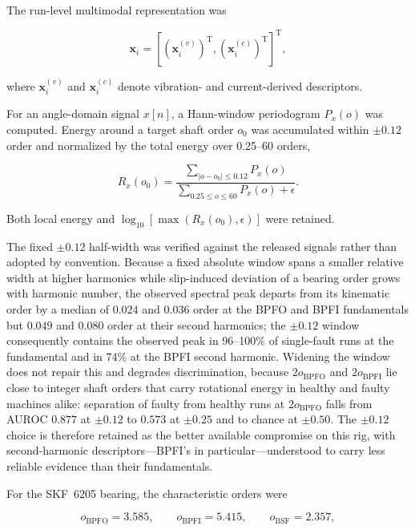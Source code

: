 \documentclass{ieeeaccess}
\begin{document}
The run-level multimodal representation was

\begin{equation}
\mathbf{x}_i =
\left[
\left(\mathbf{x}^{(v)}_i\right)^{\mathrm{T}},
\left(\mathbf{x}^{(c)}_i\right)^{\mathrm{T}}
\right]^{\mathrm{T}},
\label{eq:multimodal_feature}
\end{equation}

where $\mathbf{x}^{(v)}_i$ and $\mathbf{x}^{(c)}_i$ denote vibration- and
current-derived descriptors.

For an angle-domain signal $x[n]$, a Hann-window periodogram $P_x(o)$ was
computed. Energy around a target shaft order $o_0$ was accumulated within
$\pm0.12$ order and normalized by the total energy over 0.25--60 orders,

\begin{equation}
R_x(o_0)
=
\frac{
\displaystyle\sum_{|o-o_0|\leq0.12} P_x(o)
}{
\displaystyle\sum_{0.25\leq o\leq60} P_x(o)+\epsilon
}.
\label{eq:implemented_bandratio}
\end{equation}

Both local energy and
$\log_{10}[\max(R_x(o_0),\epsilon)]$ were retained.

The fixed $\pm0.12$ half-width was verified against the released signals
rather than adopted by convention. Because a fixed absolute window spans a
smaller relative width at higher harmonics while slip-induced deviation of a
bearing order grows with harmonic number, the observed spectral peak departs
from its kinematic order by a median of $0.024$ and $0.036$ order at the BPFO
and BPFI fundamentals but $0.049$ and $0.080$ order at their second
harmonics; the $\pm0.12$ window consequently contains the observed peak in
96--100\% of single-fault runs at the fundamental and in 74\% at the BPFI
second harmonic. Widening the window does not repair this and degrades
discrimination, because $2 o_{\mathrm{BPFO}}$ and $2 o_{\mathrm{BPFI}}$ lie
close to integer shaft orders that carry rotational energy in healthy and
faulty machines alike: separation of faulty from healthy runs at
$2 o_{\mathrm{BPFO}}$ falls from AUROC $0.877$ at $\pm0.12$ to $0.573$ at
$\pm0.25$ and to chance at $\pm0.50$. The $\pm0.12$ choice is therefore
retained as the better available compromise on this rig, with
second-harmonic descriptors---BPFI's in particular---understood to carry
less reliable evidence than their fundamentals.

For the SKF~6205 bearing, the characteristic orders were

\begin{equation}
o_{\mathrm{BPFO}}=3.585,\qquad
o_{\mathrm{BPFI}}=5.415,\qquad
o_{\mathrm{BSF}}=2.357,
\label{eq:bearing_orders}
\end{equation}
\end{document}
